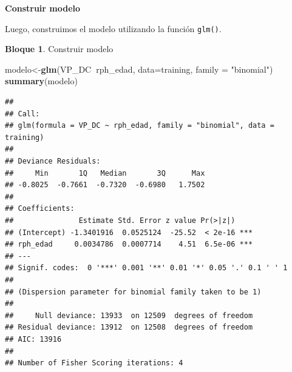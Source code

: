 \documentclass[]{book}
\newenvironment{Shaded}{\begin{snugshade}}{\end{snugshade}}
\newcommand{\DataTypeTok}[1]{\textcolor[rgb]{0.13,0.29,0.53}{#1}}
\newcommand{\DecValTok}[1]{\textcolor[rgb]{0.00,0.00,0.81}{#1}}
\newcommand{\KeywordTok}[1]{\textcolor[rgb]{0.13,0.29,0.53}{\textbf{#1}}}
\newcommand{\NormalTok}[1]{#1}
\newcommand{\OperatorTok}[1]{\textcolor[rgb]{0.81,0.36,0.00}{\textbf{#1}}}
\newcommand{\StringTok}[1]{\textcolor[rgb]{0.31,0.60,0.02}{#1}}
\theoremstyle{definition}
\theoremstyle{definition}
\newtheorem{example}{Bloque}[chapter]
\theoremstyle{definition}
\theoremstyle{definition}
\theoremstyle{remark}
\begin{document}
\begin{Shaded}
\end{Shaded}

\textbf{Construir modelo}

Luego, construimos el modelo utilizando la función \texttt{glm()}.

\begin{example}
\protect\hypertarget{exm:bloque16nbm}{}{\label{exm:bloque16nbm} }Construir modelo
\end{example}

\begin{Shaded}
\begin{Highlighting}[]
\NormalTok{modelo<-}\KeywordTok{glm}\NormalTok{(VP_DC}\OperatorTok{~}\NormalTok{rph_edad, }
            \DataTypeTok{data=}\NormalTok{training, }
            \DataTypeTok{family =} \StringTok{"binomial"}\NormalTok{)}
\KeywordTok{summary}\NormalTok{(modelo)}
\end{Highlighting}
\end{Shaded}

\begin{verbatim}
## 
## Call:
## glm(formula = VP_DC ~ rph_edad, family = "binomial", data = training)
## 
## Deviance Residuals: 
##     Min       1Q   Median       3Q      Max  
## -0.8025  -0.7661  -0.7320  -0.6980   1.7502  
## 
## Coefficients:
##               Estimate Std. Error z value Pr(>|z|)    
## (Intercept) -1.3401916  0.0525124  -25.52  < 2e-16 ***
## rph_edad     0.0034786  0.0007714    4.51  6.5e-06 ***
## ---
## Signif. codes:  0 '***' 0.001 '**' 0.01 '*' 0.05 '.' 0.1 ' ' 1
## 
## (Dispersion parameter for binomial family taken to be 1)
## 
##     Null deviance: 13933  on 12509  degrees of freedom
## Residual deviance: 13912  on 12508  degrees of freedom
## AIC: 13916
## 
## Number of Fisher Scoring iterations: 4
\end{verbatim}
\end{document}
